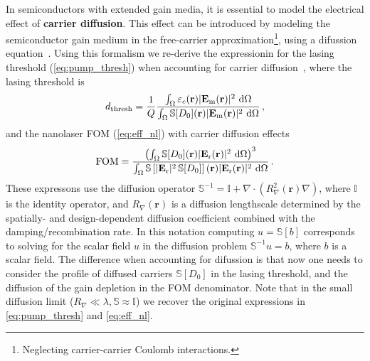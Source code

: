 In semiconductors with extended gain media, it is essential to model the electrical effect of \textbf{carrier diffusion}. This effect can be introduced by modeling the semiconductor gain medium in the free-carrier approximation\footnote{Neglecting carrier-carrier Coulomb interactions.}, using a difussion 
equation~\cite{csalt}. Using this formalism we re-derive the expressionin for the lasing threshold (\eqref{eq:pump_thresh}) when accounting for carrier diffusion~\cite{ownpub4}, where the lasing threshold is
\begin{equation}\label{eq:pump_thresh_diff}
    d_\text{thresh} = \frac{1}{Q} \frac{\int_{\Omega} \varepsilon_c(\mathbf{r})|\mathbf{E}_{\text{m}}(\mathbf{r})|^2\,  \mathop{}\!\text{d} \Omega}{\int_{\Omega} \mathbb{S} [D_0] (\mathbf{r}) |\mathbf{E}_{\text{m}}(\mathbf{r})|^2\,  \mathop{}\!\text{d} \Omega}\,,
\end{equation}
and the nanolaser FOM (\eqref{eq:eff_nl}) with carrier diffusion effects
\begin{equation}\label{eq:eff_diff}
    \text{FOM} =  \frac{\left(\int_{\Omega} \mathbb{S} [D_0](\mathbf{r}) |\mathbf{E}_{\text{r}}(\mathbf{r})|^2 \,  \mathop{}\!\text{d} \Omega\right)^3} {\int_{\Omega} \mathbb{S}\left[ |\mathbf{E}_{\text{r}}|^2\, \mathbb{S} [D_0] \right] (\mathbf{r})|\mathbf{E}_{\text{r}}(\mathbf{r})|^2 \,  \mathop{}\!\text{d} \Omega}\,.
\end{equation}
These expressons use the diffusion operator $\mathbb{S}^{-1}= \mathbb{I}+\nabla \cdot (R_\nabla^2(\mathbf{r}) \nabla)$, where $\mathbb{I}$ is the identity operator, and $R_\nabla (\mathbf{r})$ is a diffusion lengthscale determined by the spatially- and design-dependent diffusion coefficient combined with the damping/recombination rate. 
In this notation computing $u = \mathbb{S}[b]$ corresponds to solving for the scalar field $u$ in the diffusion problem $\mathbb{S}^{-1}u=b$, where $b$ is a scalar field. 
The difference when accounting for difussion is that now one needs to consider the profile of diffused carriers $\mathbb{S} [D_0]$ in the lasing threshold, and the diffusion of the gain depletion
in the FOM denominator. Note that in the small diffusion limit ($R_\nabla \ll \lambda, \mathbb{S} \approx \mathbb{I}$)
we recover the original expressions in \eqref{eq:pump_thresh} and \eqref{eq:eff_nl}.

